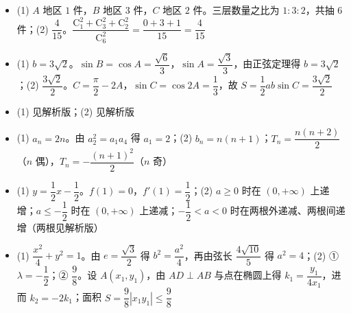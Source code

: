 \begin{itemize}[leftmargin=2.6em]
  \item[\textbf{16.}] (1) $A$ 地区 $1$ 件，$B$ 地区 $3$ 件，$C$ 地区 $2$ 件。三层数量之比为 $1:3:2$，共抽 $6$ 件；(2) $\dfrac4{15}$。$\dfrac{\mathrm C_1^2+\mathrm C_3^2+\mathrm C_2^2}{\mathrm C_6^2}=\dfrac{0+3+1}{15}=\dfrac4{15}$
  \item[\textbf{17.}] (1) $b=3\sqrt2$。$\sin B=\cos A=\dfrac{\sqrt6}3$，$\sin A=\dfrac{\sqrt3}3$，由正弦定理得 $b=3\sqrt2$；(2) $\dfrac{3\sqrt2}2$。$C=\dfrac\pi2-2A$，$\sin C=\cos2A=\dfrac13$，故 $S=\dfrac12ab\sin C=\dfrac{3\sqrt2}2$
  \item[\textbf{18.}] (1) 见解析版；(2) 见解析版
  \item[\textbf{19.}] (1) $a_n=2n$。由 $a_2^2=a_1a_4$ 得 $a_1=2$；(2) $b_n=n(n+1)$；$T_n=\dfrac{n(n+2)}2$（$n$ 偶），$T_n=-\dfrac{(n+1)^2}2$（$n$ 奇）
  \item[\textbf{20.}] (1) $y=\dfrac12x-\dfrac12$。$f(1)=0$，$f'(1)=\dfrac12$；(2) $a\geqslant0$ 时在 $(0,+\infty)$ 上递增；$a\leqslant-\dfrac12$ 时在 $(0,+\infty)$ 上递减；$-\dfrac12<a<0$ 时在两根外递减、两根间递增（两根见解析版）
  \item[\textbf{21.}] (1) $\dfrac{x^2}4+y^2=1$。由 $e=\dfrac{\sqrt3}2$ 得 $b^2=\dfrac{a^2}4$，再由弦长 $\dfrac{4\sqrt{10}}5$ 得 $a^2=4$；(2) ① $\lambda=-\dfrac12$；② $\dfrac98$。设 $A(x_1,y_1)$，由 $AD\perp AB$ 与点在椭圆上得 $k_1=\dfrac{y_1}{4x_1}$，进而 $k_2=-2k_1$；面积 $S=\dfrac98|x_1y_1|\leqslant\dfrac98$
\end{itemize}
